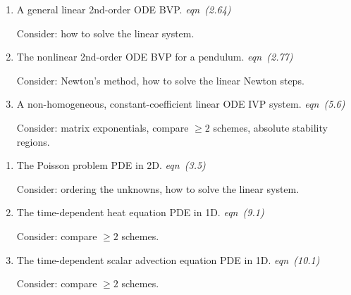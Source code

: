 \documentclass[12pt]{amsart}
\newcommand*\circled[1]{\tikz[baseline=(char.base)]{
            \node[shape=circle,draw,inner sep=2pt] (char) {#1};}}
\begin{document}
\medskip

\newcommand{\ecomment}[1]{ \hfill \mbox{\emph{#1}} }

\renewcommand{\labelenumi}{ODE \circled{\arabic{enumi}}}
\begin{enumerate}
\setlength{\itemsep}{4pt}
\item A general linear 2nd-order ODE BVP. \ecomment{eqn (2.64)}

\noindent Consider: how to solve the linear system.
\item The nonlinear 2nd-order ODE BVP for a pendulum.  \ecomment{eqn (2.77)}

\noindent Consider: Newton's method, how to solve the linear Newton steps.
\item A non-homogeneous, constant-coefficient linear ODE IVP system.  \ecomment{eqn (5.6)}

\noindent Consider: matrix exponentials, compare $\ge 2$ schemes, absolute stability regions.
\end{enumerate}

\renewcommand{\labelenumi}{PDE \circled{\alph{enumi}}}
\begin{enumerate}
\setlength{\itemsep}{4pt}
\item The Poisson problem PDE in 2D. \ecomment{eqn (3.5)}

\noindent Consider: ordering the unknowns, how to solve the linear system.
\item The time-dependent heat equation PDE in 1D. \ecomment{eqn (9.1)}

\noindent Consider: compare $\ge 2$ schemes.
\item The time-dependent scalar advection equation PDE in 1D.  \ecomment{eqn (10.1)}

\noindent Consider: compare $\ge 2$ schemes.
\end{enumerate}
\end{document}
